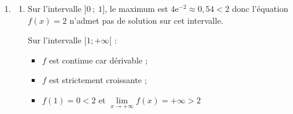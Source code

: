 \documentclass[10pt]{article}
\providecommand{\e}{{\mathrm{e}}}
\begin{document}
\begin{enumerate}
\begin{enumerate}
On a alors :\quad $\forall x \in ]0;+\infty[ 
\begin{cases} u'(x)=1 \\ v'(x)=2 \times \dfrac{1}{x} \times \ln x 
\end{cases}$ 

Or :\quad $f' = u'v+v'u$ 

Donc, $\begin{aligned}[t]\forall x \in ] 0 ;+\infty[, \quad f'(x)&= 1 \times (\ln x)^2 + x \times \dfrac{2 \ln x}{x}\\
		&= \ln x \times \ln x + 2 \ln x \\
		&=(\ln x)(\ln x +2)
\end{aligned}$
		
Donc sur l'intervalle $]0~;~+\infty[$, \: $f'(x) = (\ln x)(2 + \ln x)$.

	\item On en déduit les variations de la fonction $f$ sur l'intervalle $]0~;~+\infty[$.

Étudions le signe de $f'(x)$ : 

$2+ \ln(x)> 0 \Longleftrightarrow \ln x > -2 \Longleftrightarrow x > \e^{-2}$ 

$\ln x > 0 \Longleftrightarrow x >1$ 

On a donc le tableau de variations suivant : 

\hfill~\hfill~

		\item $f\left(\e^{-2}\right) = \e^{-2} \left( \ln \left(\e^{-2}\right) \right) ^2= \e^{-2} \times (-2)^2= 4 \e^{-2}$

Le maximum de la fonction $f$ sur l'intervalle $]0~;~1]$ est $4\e^{-2}$.
	\end{enumerate}

\item 
	\begin{enumerate}
		\item Sur l'intervalle $]0~;~1]$, le maximum est $4\e^{-2} \approx 0,54 < 2$ donc l'équation $f(x) = 2$ n'admet pas de solution sur cet intervalle.

Sur l'intervalle $[1; +\infty[$ : 
\begin{itemize}
	\item $f$ est continue car dérivable ;
	\item $f$ est strictement croissante ;
	\item $f(1) =0 <2$ et $\lim\limits_{x \to +\infty} f(x)= +\infty >2$ 
\end{itemize}


\end{enumerate}
\end{enumerate}
\end{document}
